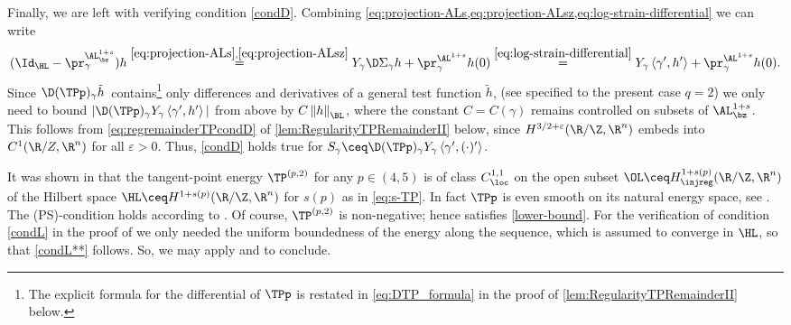 \begin{refproof}
Finally, we are left with verifying condition \ref{condD}. Combining \cref{eq:projection-ALs,eq:projection-ALsz,eq:log-strain-differential} we can write 
\begin{align*}
    ( \Id_{\HL}-\pr^{\AL^{1+s}_{\bz}}_{\gamma})h \overset{\eqref{eq:projection-ALs},\eqref{eq:projection-ALsz}}{=}Y_{\gamma}\D\Sigma_{\gamma}h+\pr^{\AL^{1+s}}_{\gamma}h(0)\overset{\eqref{eq:log-strain-differential}}{=}Y_\gamma \left\langle \gamma',h' \right\rangle +\pr^{\AL^{1+s}}_{\gamma}h(0).
\end{align*}
Since $ \D(\TPp)_{\gamma}\tilde{h}\, $ contains\footnote{The explicit formula for the differential of $ \TPp $ is restated in \cref{eq:DTP_formula} in the proof of \cref{lem:RegularityTPRemainderII} below.} only differences and derivatives of a general test function $ \tilde{h} $, {(see \cite[(1.11) in Theorem 1.4]{blatt-reiter_2015a} specified to the present case $ q=2 $)} we only need to bound 
$|\D(\TPp)_{\gamma}Y_\gamma \left\langle \gamma',h' \right\rangle |$
from above by $ C\left\|h \right\|_{\BL} $, where the constant $ C=C(\gamma) $ remains controlled on \Econtrolled{\TPp} subsets of $ \AL_{\bz}^{1+s} $. This follows from \cref{eq:regremainderTPcondD} of \cref{lem:RegularityTPRemainderII} below, since $ H^{3/2+\varepsilon}(\R/\Z,\R^n) $ embeds into $ C^1(\R/Z,\R^n) $ for all $ \varepsilon>0 $. Thus, \ref{condD} holds true for $ S_{\gamma}\ceq\D(\TPp)_{\gamma}Y_\gamma \left\langle \gamma',(\cdot)' \right\rangle  $.
\end{refproof}

\begin{refproof}
It was shown in \cite[Theorem 3.5]{steenebruegge_2023} that the 
tangent-point energy $\TP^{(p,2)}$ for any $p\in (4,5)$ is of class
$C^{1,1}_\loc$ on the open subset $\OL \ceq H^{1+s(p)}_\injreg(\R/\Z,\R^n)$
of the Hilbert space $\HL \ceq H^{1+s(p)}(\R/\Z,\R^n)$
for $s(p)$ as in \cref{eq:s-TP}. In fact $ \TPp $ is even smooth on its natural energy space, see \cite[Theorem 4.6]{doehrer-etal_2025}. The (PS)-condition holds according
to . Of course, $\TP^{(p,2)}$ is non-negative; hence
satisfies \ref{lower-bound}. For the verification of
condition \ref{condL}  in the proof of
  we only needed the uniform boundedness of
the energy along the sequence, which is assumed to converge in $\HL$,
so that \ref{condL**} follows. So, we may apply 
and
to conclude.
\end{refproof}

